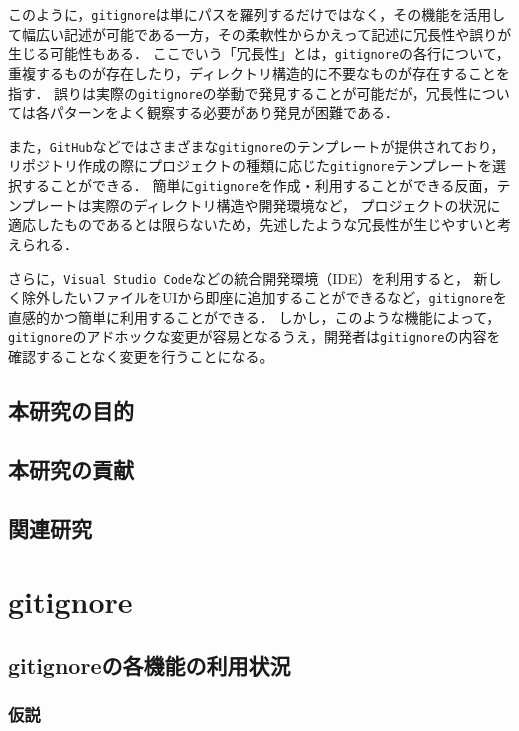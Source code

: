 \documentclass[a4paper,xelatex,ja=standard,fontsize=11pt]{bxjsreport}
\newcommand{\gitignore}{\texttt{gitignore}}
\begin{document}
このように，\gitignore{}は単にパスを羅列するだけではなく，その機能を活用して幅広い記述が可能である一方，その柔軟性からかえって記述に冗長性や誤りが生じる可能性もある．
ここでいう「冗長性」とは，\gitignore{}の各行について，重複するものが存在したり，ディレクトリ構造的に不要なものが存在することを指す．
誤りは実際の\gitignore{}の挙動で発見することが可能だが，冗長性については各パターンをよく観察する必要があり発見が困難である．

また，\texttt{GitHub}などではさまざまな\gitignore{}のテンプレートが提供されており，リポジトリ作成の際にプロジェクトの種類に応じた\gitignore{}テンプレートを選択することができる．
簡単に\gitignore{}を作成・利用することができる反面，テンプレートは実際のディレクトリ構造や開発環境など，
プロジェクトの状況に適応したものであるとは限らないため，先述したような冗長性が生じやすいと考えられる．

さらに，\texttt{Visual Studio Code}などの統合開発環境（IDE）を利用すると，
新しく除外したいファイルをUIから即座に追加することができるなど，\gitignore{}を直感的かつ簡単に利用することができる．
しかし，このような機能によって，\gitignore{}のアドホックな変更が容易となるうえ，開発者は\gitignore{}の内容を確認することなく変更を行うことになる。

\section{本研究の目的}

\section{本研究の貢献}

\section{関連研究}

%
\chapter{\textrm{gitignore}}

\section{\textrm{gitignore}の各機能の利用状況}


\subsection{仮説}
\end{document}

